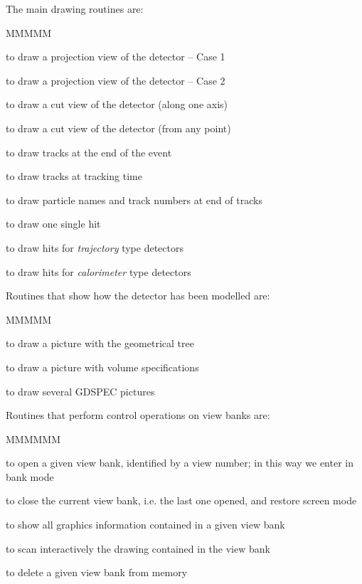 The main drawing routines are:
\begin{DLtt}{MMMMM}
\item[\Rind{GDRAW}]  to draw a projection view of the detector -- Case 1
\item[\Rind{GDRVOL}] to draw a projection view of the detector --  Case 2
\item[\Rind{GDRAWC}] to draw a cut view of the detector (along one axis)
\item[\Rind{GDRAWX}] to draw a cut view of the detector (from any point)
\item[\Rind{GDXYZ}]  to draw tracks at the end of the event
\item[\Rind{GDCXYZ}] to draw tracks at tracking time
\item[\Rind{GDPART}] to draw particle names and track numbers at end of tracks
\item[\Rind{GDAHIT}] to draw one single hit
\item[\Rind{GDHITS}] to draw hits for {\it trajectory} type detectors
\item[\Rind{GDCHIT}] to draw hits for {\it calorimeter} type detectors
\end{DLtt}
 
Routines that show how the detector has been modelled are:
\begin{DLtt}{MMMMM}
\item[\Rind{GDTREE}] to draw a picture with the geometrical tree
\item[\Rind{GDSPEC}] to draw a picture with volume specifications
\item[\Rind{GDFSPC}] to draw several GDSPEC pictures
\end{DLtt}
 
Routines that perform control operations on view banks are:
\begin{DLtt}{MMMMMM}
\item[\Rind{GDOPEN}] to open a given view bank, identified by a
                     view number; in this way we enter in bank mode
\item[\Rind{GDCLOS}] to close the current view bank, i.e. the last one
                     opened, and restore screen mode
\item[\Rind{GDSHOW}] to show all graphics information contained in a
                     given view bank
\item[\Rind{GDLENS}] to scan interactively the drawing contained in the view bank 
\item[\Rind{GDELET}] to delete a given view bank from memory
\end{DLtt}

